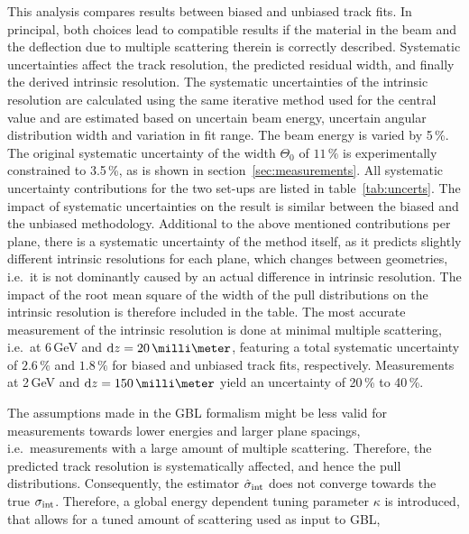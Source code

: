 This analysis compares results between biased and unbiased track fits. 
In principal, both choices lead to compatible results if the material in the beam and the deflection due to multiple scattering therein is correctly described. 
Systematic uncertainties affect the track resolution, the predicted residual width, and finally the derived intrinsic resolution. 
The systematic uncertainties of the intrinsic resolution are calculated using the same iterative method used for the central value and
 are estimated based on uncertain beam energy, uncertain angular distribution width and variation in fit range. 
The beam energy is varied by 5\,\%. 
The original systematic uncertainty of the width $\Theta_{0}$ of $11\,\%$ is experimentally constrained to 3.5\,\%, as is shown in section~\ref{sec:measurements}. 
All systematic uncertainty contributions for the two set-ups are listed in table~\ref{tab:uncerts}. 
The impact of systematic uncertainties on the result is similar between the biased and the unbiased methodology. 
Additional to the above mentioned contributions per plane,
 there is a systematic uncertainty of the method itself, as it predicts slightly different intrinsic resolutions for each plane, which changes between geometries,
 i.e.\ it is not dominantly caused by an actual difference in intrinsic resolution. 
The impact of the root mean square of the width of the pull distributions on the intrinsic resolution is therefore included in the table. 
The most accurate measurement of the intrinsic resolution is done at minimal multiple scattering, i.e.\ at 6\,GeV and $\dz = 20\,\milli\meter$,
 featuring a total systematic uncertainty of $2.6\,\%$ and $1.8\,\%$ for biased and unbiased track fits, respectively. 
Measurements at 2\,GeV and $\dz = 150\,\milli\meter$ yield an uncertainty of 20\,\% to 40\,\%. 

The assumptions made in the GBL formalism might be less valid for measurements towards lower energies and larger plane spacings, i.e.\ measurements with a large amount of multiple scattering. 
Therefore, the predicted track resolution is systematically affected, and hence the pull distributions. 
Consequently, the estimator $\hat{\sigma}_{\textrm{int}}$ does not converge towards the true $\sigma_{\textrm{int}}$. 
Therefore, a global energy dependent tuning parameter $\kappa$ is introduced,
 that allows for a tuned amount of scattering used as input to GBL,

